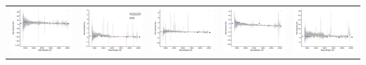 \begin{center}
\begin{longtable}{l l l l l }
    \includegraphics[width=0.19\linewidth, clip]{Figs/Figs-lamost/spec-57388-EG015238N022953M01_sp07-195-STRIPE82-0044-041254.pdf} & \includegraphics[width=0.19\linewidth, clip]{Figs/Figs-lamost/spec-57453-HD143257N033933M01_sp16-159-SPLUS-n05n50-013917.pdf} & \includegraphics[width=0.19\linewidth, clip]{Figs/Figs-lamost/spec-57453-HD143257N033933M01_sp16-196-SPLUS-n05n50-021799.pdf} & \includegraphics[width=0.19\linewidth, clip]{Figs/Figs-lamost/spec-57482-HD122600N020231B02_sp04-104-SPLUS-n02n28-039381.pdf} & \includegraphics[width=0.19\linewidth, clip]{Figs/Figs-lamost/spec-57688-EG215014S003621M01_sp04-037-STRIPE82-0125-053114.pdf} \\

\end{longtable}
\end{center}
